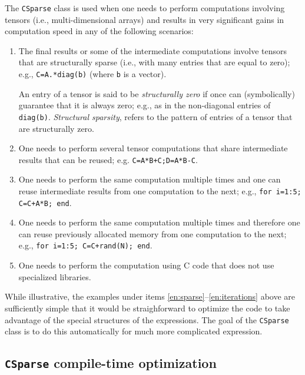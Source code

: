 \documentclass[11pt]{article}
\newcommand{\CS}{\texttt{CSparse}}
\begin{document}
The \CS{} class is used when one needs to perform computations
involving tensors (i.e., multi-dimensional arrays) and results in very
significant gains in computation speed in any of the following scenarios:
\begin{enumerate}
\item \label{en:sparse} The final results or some of the intermediate
  computations involve tensors that are structurally sparse (i.e.,
  with many entries that are equal to zero); e.g.,
  \lstinline{C=A.*diag(b)} (where \lstinline{b} is a vector).

  An entry of a tensor is said to be \emph{structurally zero} if once
  can (symbolically) guarantee that it is always zero; e.g., as in the
  non-diagonal entries of \lstinline{diag(b)}. \emph{Structural
    sparsity}, refers to the pattern of entries of a tensor that are
  structurally zero.

\item \label{en:intermediate} One needs to perform several tensor
  computations that share intermediate results that can be
  reused; e.g. \lstinline{C=A*B+C;D=A*B-C}.

\item \label{en:iterations} One needs to perform the same computation
  multiple times and one can reuse intermediate results from one
  computation to the next; e.g., \lstinline{for i=1:5; C=C+A*B; end}.

\item One needs to perform the same computation multiple times and
  therefore one can reuse previously allocated memory from one
  computation to the next; e.g., \lstinline{for i=1:5; C=C+rand(N); end}.

\item One needs to perform the computation using C code that does
  not use specialized libraries.
\end{enumerate}
While illustrative, the examples under items
\ref{en:sparse}--\ref{en:iterations} above are sufficiently simple
that it would be straighforward to optimize the \matlab{} code to take
advantage of the special structures of the expressions. The goal of
the \CS{} class is to do this automatically for much more complicated
expression.

\subsection{\CS{} compile-time optimization}
\end{document}
